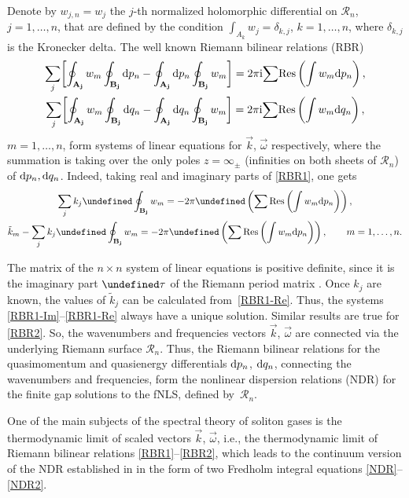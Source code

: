 \documentclass[pdftex]{sigma}
\numberwithin{equation}{section}
\let\Re\undefined
\let\Im\undefined
\DeclareMathOperator{\Re}{Re}
\DeclareMathOperator{\Im}{Im}
\renewcommand{\d}{\delta}
\renewcommand{\o}{\omega}
\def\Rscr{\mathcal{R}}
\def\o{\omega}
\def\d{\delta}
\def\tk{\tilde k}
\begin{document}
Denote by $w_{j,n}=w_j$ the $j$-th normalized holomorphic differential on $\Rscr_n$, $j=1,\dots,n$, that are defined by the condition $\int_{A_k}w_j =\d_{k,j}$, $k=1,\dots,n$, where $\d_{k,j}$ is the Kronecker delta. The well known Riemann bilinear relations (RBR)
\begin{gather}
\sum_j\biggl[\oint_{\bf A_j}w_m\oint_{\bf B_j}{\rm d}p_n-\oint_{\bf A_j}{\rm d}p_n\oint_{\bf B_j}w_m\biggr]=2\pi {\rm i} {\sum} {\rm Res}\left(\int w_m {\rm d}p_n\right), \label{RBR1}\\
\sum_j\biggl[\oint_{\bf A_j}w_m\oint_{\bf B_j}{\rm d}q_n-\oint_{\bf A_j}{\rm d}q_n\oint_{\bf B_j}w_m\biggr]=2\pi {\rm i} {\sum} {\rm Res}\left(\int w_m {\rm d}q_n\right),
\label{RBR2}
\end{gather}
$m=1,\dots,n$, form systems of linear equations for $\vec k$, $\vec \o$ respectively, where the summation is taking over the only poles $z=\infty_\pm$ (infinities on both sheets of $\Rscr_n$) of ${\rm d}p_n,{\rm d}q_n$. Indeed,
taking real and imaginary parts of \eqref{RBR1}, one gets
 \begin{gather}
\sum_j k_j \Im \oint_{\bf B_j}w_m=-2\pi \Re\left( \sum {\rm Res}\left(\int w_m {\rm d}p_n\right) \right), \label{RBR1-Im} \\
\tk_m - \sum_j k_j \Re \oint_{\bf B_j}w_m=-2\pi \Im\left( \sum {\rm Res}\left(\int w_m {\rm d}p_n\right) \right),\qquad m=1,\dots,n.
\label{RBR1-Re}
\end{gather}

The matrix of the $n\times n$ system of linear equations is positive definite, since it is the imaginary part $\Im \tau$ of the Riemann period matrix . Once $k_j$ are known, the values of $\tk_j$ can be calculated from~\eqref{RBR1-Re}.
Thus, the systems \eqref{RBR1-Im}--\eqref{RBR1-Re} always have a unique solution.
Similar results are true for \eqref{RBR2}.
So, the wavenumbers and frequencies vectors $\vec k$, $\vec \o$ are connected via the underlying Riemann surface $\Rscr_n$. Thus, the Riemann bilinear relations for the quasimomentum and quasienergy differentials ${\rm d}p_n$, ${\rm d}q_n$, connecting the wavenumbers and frequencies, form the nonlinear dispersion relations (NDR) for the finite gap solutions to the fNLS, defined by~$\Rscr_n$.

One of the main subjects of the spectral theory of soliton gases is the thermodynamic limit of scaled vectors $\vec k$, $\vec\o$, i.e., the thermodynamic limit of Riemann bilinear relations \eqref{RBR1}--\eqref{RBR2}, which leads to the continuum version of the NDR established in \cite{ET2020} in the form of two Fredholm integral equations \eqref{NDR}--\eqref{NDR2}.
\end{document}
